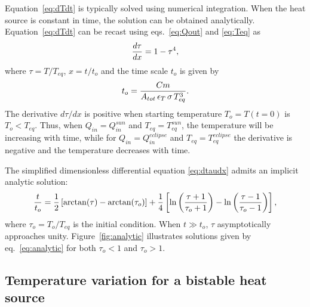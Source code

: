 \documentclass[]{aastex62}
\def\eq#1{\begin{equation} #1 \end{equation}}
\begin{document}
Equation~\ref{eq:dTdt} is typically solved using numerical integration. When the heat source is constant
in time, the solution can be obtained analytically. Equation~\ref{eq:dTdt} can be recast using 
eqs.~\ref{eq:Qout}  and \ref{eq:Teq} as 
\eq{
\label{eq:dtaudx}
               {d\tau \over dx }  = 1 - \tau^4, 
}
where $\tau=T/T_{eq}$, $x=t/t_o$ and the time scale $t_o$ is given by 
\eq{
\label{eq:t0}
     t_o =   { C m \over A_{tot} \, \epsilon_T \, \sigma \, T_{eq}^3}. 
}
The derivative $d\tau/ dx$ is positive when starting temperature $T_o=T(t=0)$ is
$T_o < T_{eq}$. Thus, when $Q_{in} = Q_{in}^{sun}$ and $T_{eq} = T_{eq}^{sun}$, the temperature
will be increasing with time, while for $Q_{in} = Q_{in}^{eclipse}$ and $T_{eq} = T_{eq}^{eclipse}$
the derivative is negative and the temperature decreases with time.

The simplified dimensionless differential equation \ref{eq:dtaudx} admits an implicit analytic 
solution:
\eq{
\label{eq:analytic}
{t \over t_o} = {1\over 2}\left[\arctan(\tau) - \arctan(\tau_o)\right] + {1\over 4}\left[\ln\left({\tau+1\over\tau_o+1}\right) - \ln\left({\tau-1\over\tau_o-1}\right) \right], 
}
where $\tau_o = T_o/T_{eq}$ is the initial condition. When $t \gg t_o$, $\tau$ asymptotically approaches unity. 
Figure~\ref{fig:analytic} illustrates solutions given by eq.~\ref{eq:analytic} for both $\tau_o<1$ and $\tau_o>1$. 



\subsection{Temperature variation for a bistable heat source} 
\end{document}
